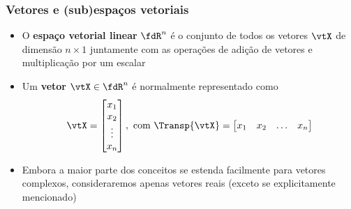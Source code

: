 \begin{frame}
  \frametitle{Vetores e (sub)espaços vetoriais}
  \begin{itemize}
    \item O \textbf{\alert{espaço vetorial linear}} $\fdR^n$ é o conjunto de todos os vetores $\vtX$ de dimensão $n\times 1$ juntamente com as operações de adição de vetores e multiplicação por um escalar \cite[cap. 2]{Strang1988}

    \item Um \textbf{\alert{vetor}} $\vtX \in \fdR^n$ é normalmente representado como
    \begin{equation}
      \vtX = \left[\begin{matrix} x_1 \\ x_2 \\ \vdots \\ x_n\end{matrix}\right], \text{ com } \Transp{\vtX} = \left[\begin{matrix} x_1 & x_2 & \ldots & x_n\end{matrix}\right]
    \end{equation}
    

    \item Embora a maior parte dos conceitos se estenda facilmente para vetores complexos, consideraremos apenas vetores reais (exceto se explicitamente mencionado)
  \end{itemize}
\end{frame}

